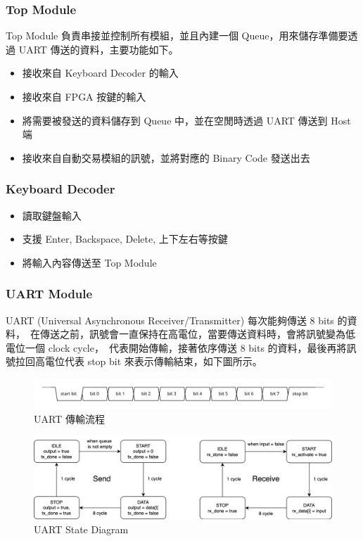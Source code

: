 \documentclass[10.5pt,compsoc,UTF8]{CjC}
\theoremstyle{mystyle}
\begin{document}
\subsubsection*{Top Module}

Top Module 負責串接並控制所有模組，並且內建一個 Queue，用來儲存準備要透過 UART 傳送的資料，主要功能如下。

\begin{itemize}
  \item 接收來自 Keyboard Decoder 的輸入
  \item 接收來自 FPGA 按鍵的輸入
  \item 將需要被發送的資料儲存到 Queue 中，並在空閒時透過 UART 傳送到 Host 端
  \item 接收來自自動交易模組的訊號，並將對應的 Binary Code 發送出去
\end{itemize}

\subsubsection*{Keyboard Decoder}

\begin{itemize}
  \item 讀取鍵盤輸入
  \item 支援 Enter, Backspace, Delete, 上下左右等按鍵
  \item 將輸入內容傳送至 Top Module
\end{itemize}

\subsubsection*{UART Module}
UART (Universal Asynchronous Receiver/Transmitter) 每次能夠傳送 8 bits 的資料，\
在傳送之前，訊號會一直保持在高電位，當要傳送資料時，會將訊號變為低電位一個 clock cycle，\
代表開始傳輸，接著依序傳送 8 bits 的資料，最後再將訊號拉回高電位代表 stop bit 來表示傳輸結束，如下圖所示。

\begin{figure}[H]
  \centering
  \includegraphics[width=\textwidth]{./img/UART.png}
  \caption{UART 傳輸流程}
\end{figure}

\begin{figure}[H]
  \centering
  \includegraphics[width=\textwidth]{./img/UART-State.png}
  \caption{UART State Diagram}
\end{figure}
\end{document}

